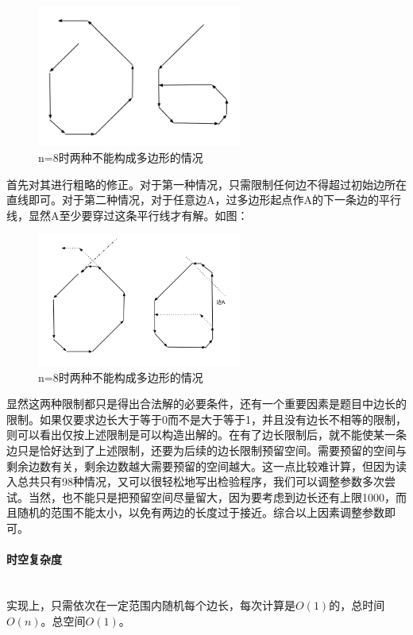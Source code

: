 \documentclass[UTF8]{ctexart}
\newcommand{\myparagraph}[1]{\paragraph{#1}\mbox{}\\}
\theoremstyle{nonumberplain}
\begin{document}
			\begin{figure}[ht]
				\centering
				\includegraphics[width=0.6\textwidth]{fig306d_1.png}
				\caption{n=8时两种不能构成多边形的情况}
			\end{figure}
			
			首先对其进行粗略的修正。对于第一种情况，只需限制任何边不得超过初始边所在直线即可。对于第二种情况，对于任意边A，过多边形起点作A的下一条边的平行线，显然A至少要穿过这条平行线才有解。如图：
			
			\begin{figure}[ht]
				\centering
				\includegraphics[width=0.6\textwidth]{fig306d_2.png}
				\caption{n=8时两种不能构成多边形的情况}
			\end{figure}
			
			显然这两种限制都只是得出合法解的必要条件，还有一个重要因素是题目中边长的限制。如果仅要求边长大于等于0而不是大于等于1，并且没有边长不相等的限制，则可以看出仅按上述限制是可以构造出解的。在有了边长限制后，就不能使某一条边只是恰好达到了上述限制，还要为后续的边长限制预留空间。需要预留的空间与剩余边数有关，剩余边数越大需要预留的空间越大。这一点比较难计算，但因为读入总共只有98种情况，又可以很轻松地写出检验程序，我们可以调整参数多次尝试。当然，也不能只是把预留空间尽量留大，因为要考虑到边长还有上限1000，而且随机的范围不能太小，以免有两边的长度过于接近。综合以上因素调整参数即可。
		
		\myparagraph{时空复杂度}
		
			实现上，只需依次在一定范围内随机每个边长，每次计算是$O(1)$的，总时间$O(n)$。总空间$O(1)$。
	
\end{document}
